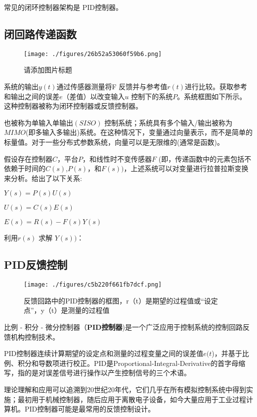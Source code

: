 常见的闭环控制器架构是 PID控制器。

\subsection{闭回路传递函数}

\begin{figure}[ht]
\centering
\texttt{[image: ./figures/26b52a53060f59b6.png]}
\caption{请添加图片标题} \label{fig_KZLL_2}
\end{figure}

系统的输出$y(t)$通过传感器测量将F 反馈并与参考值$r(t)$进行比较。获取参考和输出之间的误差$e$（差值）以改变输入$u$ 控制下的系统$P$。系统框图如下所示。这种控制器被称为闭环控制器或反馈控制器。

也被称为单输入单输出$(SISO)$ 控制系统；系统具有多个输入/输出被称为$MIMO$(即多输入多输出)系统。在这种情况下，变量通过向量表示，而不是简单的标量值。对于一些分布式参数系统，向量可以是无限维的(通常是函数)。

假设存在控制器$C$，平台$P$，和线性时不变传感器$F$ (即，传递函数中的元素包括不依赖于时间的$C(s)$,$P(s)$，和$F(s))$，上述系统可以对变量进行拉普拉斯变换来分析。给出了以下关系:

$Y(s)=P(s)U(s)$

$U(s)=C(s)E(s)$

$E(s)=R(s)-F(s)Y(s)$

利用$r(s )$ 求解 $Y(s) )$：


\subsection{PID反馈控制}

\begin{figure}[ht]
\centering
\texttt{[image: ./figures/c5b220f661fb7dcf.png]}
\caption{反馈回路中的PID控制器的框图，r（t）是期望的过程值或“设定点”，y（t）是测量的过程值} \label{fig_KZLL_1}
\end{figure}

比例 - 积分 - 微分控制器（\textbf{PID控制器})是一个广泛应用于控制系统的控制回路反馈机构控制技术。

PID控制器连续计算期望的设定点和测量的过程变量之间的误差值$e(t$)，并基于比例、积分和导数项进行校正。PID是Proportional-Integral-Derivative的首字母缩写，指的是对误差信号进行操作以产生控制信号的三个术语。

理论理解和应用可以追溯到20世纪20年代，它们几乎在所有模拟控制系统中得到实施；最初用于机械控制器，随后应用于离散电子设备，如今大量应用于工业过程计算机。PID控制器可能是最常用的反馈控制设计。

